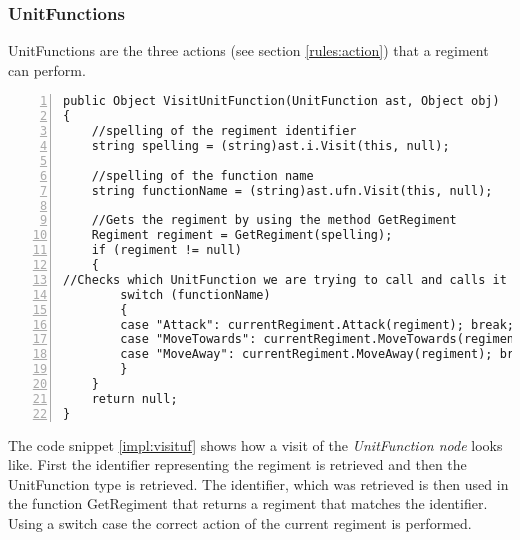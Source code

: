 	\subsubsection{UnitFunctions}
		UnitFunctions are the three actions (see section \ref{rules:action}) that a regiment can perform.
		\begin{lstlisting}[basicstyle=\small\sffamily,
			keywords={break,case,const,continue,default,else,enum,
			for,if,return,switch,while,do,long,void,int,float,double,
			char,struct,typedef,include,size\_t},
			keywordstyle={\color{blue}},
			comment={[l]{//}}, morecomment={[s]{/*}{*/}}, commentstyle=\itshape,
			columns={[l]flexible}, numbers=left, numberstyle=\tiny,
			frameround=fftt, frame=shadowbox, captionpos=b,
			caption={VisitUnitFunction from the class },
			label=impl:visituf]	
public Object VisitUnitFunction(UnitFunction ast, Object obj)
{
	//spelling of the regiment identifier
	string spelling = (string)ast.i.Visit(this, null);
	
	//spelling of the function name
	string functionName = (string)ast.ufn.Visit(this, null);
	
	//Gets the regiment by using the method GetRegiment
	Regiment regiment = GetRegiment(spelling);
	if (regiment != null)
	{
//Checks which UnitFunction we are trying to call and calls it from the regiment class
		switch (functionName)
		{
		case "Attack": currentRegiment.Attack(regiment); break;
		case "MoveTowards": currentRegiment.MoveTowards(regiment); break;
		case "MoveAway": currentRegiment.MoveAway(regiment); break;
		}
	}
	return null;
}		\end{lstlisting}
		The code snippet \ref{impl:visituf} shows how a visit of the {\it UnitFunction node} looks like. 
		First the identifier representing the regiment is retrieved and then the UnitFunction type is retrieved.
		The identifier, which was retrieved is then used in the function GetRegiment that returns a regiment that matches the identifier.
		Using a switch case the correct action of the current regiment is performed.
		
